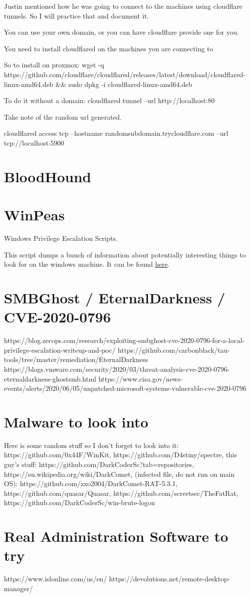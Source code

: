 \documentclass{article}
\begin{document}
Justin mentioned how he was going to connect to the machines using cloudflare tunnels. So I will practice that and document it.

You can use your own domain, or you can have cloudflare provide one for you.

You need to install cloudflared on the machines you are connecting to

So to install on proxmox:
wget -q https://github.com/cloudflare/cloudflared/releases/latest/download/cloudflared-linux-amd64.deb \&\& sudo dpkg -i cloudflared-linux-amd64.deb

To do it without a domain: cloudflared tunnel --url http://localhost:80

Take note of the random url generated.

cloudflared access tcp --hostname randomsubdomain.trycloudflare.com --url tcp://localhost:5900

\section{BloodHound}

\section{WinPeas}
Windows Privilege Escalation Scripts.

This script dumps a bunch of information about potentially interesting things to look for on
 the windows machine. It can be found \href{https://github.com/carlospolop/PEASS-ng/tree/master/winPEAS}{here}.
 

\section{SMBGhost / EternalDarkness / CVE-2020-0796}
https://blog.zecops.com/research/exploiting-smbghost-cve-2020-0796-for-a-local-privilege-escalation-writeup-and-poc/
https://github.com/carbonblack/tau-tools/tree/master/remediation/EternalDarkness
https://blogs.vmware.com/security/2020/03/threat-analysis-cve-2020-0796-eternaldarkness-ghostsmb.html
https://www.cisa.gov/news-events/alerts/2020/06/05/unpatched-microsoft-systems-vulnerable-cve-2020-0796

\section{Malware to look into}
Here is some random stuff so I don't forget to look into it:
https://github.com/0x44F/WinKit, https://github.com/D4stiny/spectre, this guy's stuff: https://github.com/DarkCoderSc?tab=repositories,
https://en.wikipedia.org/wiki/DarkComet, (infected file, do not run on main OS): https://github.com/zxo2004/DarkComet-RAT-5.3.1,
https://github.com/quasar/Quasar, https://github.com/screetsec/TheFatRat, https://github.com/DarkCoderSc/win-brute-logon

\section{Real Administration Software to try}
https://www.islonline.com/us/en/
https://devolutions.net/remote-desktop-manager/
\end{document}
